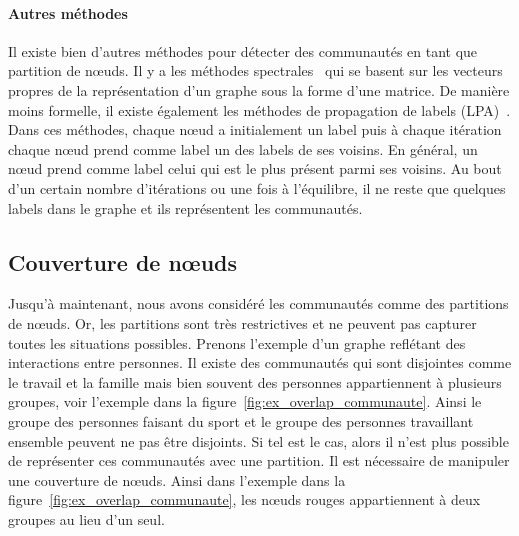\paragraph{Autres méthodes}
Il existe bien d'autres méthodes pour détecter des communautés en tant que partition de n\oe uds.
Il y a les méthodes spectrales~\cite{Donetti2004,Mitrovic2009} qui se basent sur les vecteurs propres de la représentation d'un graphe sous la forme d'une matrice.
De manière moins formelle, il existe également les méthodes de propagation de labels (LPA)~\cite{Raghavan2007a,Li2014c}.
Dans ces méthodes, chaque n\oe ud a initialement un label puis à chaque itération chaque n\oe ud prend comme label un des labels de ses voisins.
En général, un n\oe ud prend comme label celui qui est le plus présent parmi ses voisins.
Au bout d'un certain nombre d'itérations ou une fois à l'équilibre, il ne reste que quelques labels dans le graphe et ils représentent les communautés.



\subsection{Couverture de n\oe uds}
\label{subsec:cover}
Jusqu'à maintenant, nous avons considéré les communautés comme des partitions de n\oe uds.
Or, les partitions sont très restrictives et ne peuvent pas capturer toutes les situations possibles.
Prenons l'exemple d'un graphe reflétant des interactions entre personnes.
Il existe des communautés qui sont disjointes comme le travail et la famille mais bien souvent des personnes appartiennent à plusieurs groupes, voir l'exemple dans la figure~\ref{fig:ex_overlap_communaute}.
Ainsi le groupe des personnes faisant du sport et le groupe des personnes travaillant ensemble peuvent ne pas être disjoints.
Si tel est le cas, alors il n'est plus possible de représenter ces communautés avec une partition.
Il est nécessaire de manipuler une couverture de n\oe uds.
Ainsi dans l'exemple dans la figure~\ref{fig:ex_overlap_communaute}, les n\oe uds rouges appartiennent à deux groupes au lieu d'un seul.

